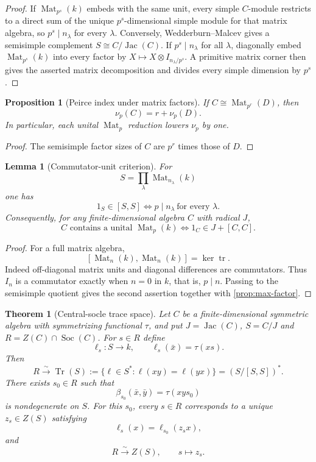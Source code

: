 \documentclass[11pt,reqno]{amsart}
\newtheorem{theorem}{Theorem}[section]
\newtheorem{proposition}[proposition]{Proposition}
\newtheorem{lemma}[lemma]{Lemma}
\theoremstyle{definition}
\theoremstyle{remark}
\theoremstyle{definition}
\newcommand{\Mat}{\operatorname{Mat}}
\newcommand{\Jac}{\operatorname{Jac}}
\newcommand{\Soc}{\operatorname{Soc}}
\newcommand{\Tr}{\operatorname{Tr}}
\newcommand{\nuP}{\nu_p}
\begin{document}
\begin{proof}
If $\Mat_{p^s}(k)$ embeds with the same unit, every simple $C$-module
restricts to a direct sum of the unique $p^s$-dimensional simple module for
that matrix algebra, so $p^s\mid n_\lambda$ for every $\lambda$.
Conversely, Wedderburn--Malcev gives a semisimple complement
$S\cong C/\Jac(C)$.  If $p^s\mid n_\lambda$ for all $\lambda$, diagonally
embed $\Mat_{p^s}(k)$ into every factor by
$X\mapsto X\otimes I_{n_\lambda/p^s}$.  A primitive matrix corner then gives
the asserted matrix decomposition and divides every simple dimension by
$p^s$.
\end{proof}

\begin{proposition}[Peirce index under matrix factors]\label{prop:index-drop}
If $C\cong\Mat_{p^r}(D)$, then
\[
 \nuP(C)=r+\nuP(D).
\]
In particular, each unital $\Mat_p$ reduction lowers $\nuP$ by one.
\end{proposition}

\begin{proof}
The semisimple factor sizes of $C$ are $p^r$ times those of $D$.
\end{proof}

\begin{lemma}[Commutator-unit criterion]\label{lem:comm-unit}
For
\[
 S=\prod_\lambda\Mat_{n_\lambda}(k)
\]
one has
\[
 1_S\in[S,S]
 \iff p\mid n_\lambda\ \text{for every }\lambda.
\]
Consequently, for any finite-dimensional algebra $C$ with radical $J$,
\[
 C\text{ contains a unital }\Mat_p(k)
 \iff 1_C\in J+[C,C].
\]
\end{lemma}

\begin{proof}
For a full matrix algebra,
\[
 [\Mat_n(k),\Mat_n(k)]=\ker\operatorname{tr}.
\]
Indeed off-diagonal matrix units and diagonal differences are commutators.
Thus $I_n$ is a commutator exactly when $n=0$ in $k$, that is, $p\mid n$.
Passing to the semisimple quotient gives the second assertion together with
\cref{prop:max-factor}.
\end{proof}

\begin{theorem}[Central-socle trace space]\label{thm:trace-space}
Let $C$ be a finite-dimensional symmetric algebra with symmetrizing
functional $\tau$, and put $J=\Jac(C)$, $S=C/J$ and
$R=Z(C)\cap\Soc(C)$. For $s\in R$ define
\[
 \ell_s:S\to k,
 \qquad \ell_s(\bar x)=\tau(xs).
\]
Then
\[
 R\xrightarrow{\sim}\Tr(S)
 :=\{\ell\in S^*: \ell(xy)=\ell(yx)\}
 =(S/[S,S])^*.
\]
There exists $s_0\in R$ such that
\[
 \beta_{s_0}(\bar x,\bar y)=\tau(xys_0)
\]
is nondegenerate on $S$.  For this $s_0$, every $s\in R$ corresponds to a
unique $z_s\in Z(S)$ satisfying
\[
 \ell_s(x)=\ell_{s_0}(z_sx),
\]
and
\[
 R\xrightarrow{\sim}Z(S),\qquad s\mapsto z_s.
\]
\end{theorem}
\end{document}
